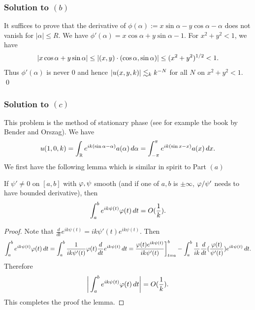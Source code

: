 \subsubsection*{Solution to $(b)$}
It suffices to prove that the derivative of $\phi(\alpha) := x\sin\alpha - y\cos\alpha - \alpha$ does not vanish for $|\alpha| \leq R$.
We have
$\phi'(\alpha) = x\cos\alpha + y\sin\alpha - 1$. For $x^{2} + y^{2} < 1$, we have
$$|x \cos\alpha + y\sin\alpha| \leq |(x, y) \cdot (\cos\alpha, \sin\alpha)| \leq (x^{2} + y^{2})^{1/2} < 1.$$
Thus $\phi'(\alpha)$ is never $0$ and hence $|u(x, y, k)| \lesssim_{k} k^{-N}$ for all $N$ on $x^{2} + y^{2} < 1$.
\hfill\qed

\subsubsection*{Solution to $(c)$}
This problem is the method of stationary phase (see for example the book by Bender and Orszag).
We have
$$u(1, 0, k) = \int_{\mathbb{R}}e^{ik(\sin\alpha - \alpha)}a(\alpha)\, d\alpha = \int_{-\pi}^{\pi}e^{ik(\sin x - x)}a(x)\, dx.$$
We first have the following lemma which is similar in spirit to Part $(a)$
\begin{lemma}\label{s077lem1}
If $\psi' \neq 0$ on $[a, b]$ with $\varphi, \psi$ smooth (and if one of $a, b$ is $\pm\infty$, $\varphi/\psi'$ needs to have bounded derivative),
then
$$\int_{a}^{b}e^{ik\psi(t)}\varphi(t)\, dt = O(\frac{1}{k}).$$
\end{lemma}
\begin{proof}
Note that $\frac{d}{dt}e^{ik\psi(t)} = ik\psi'(t)e^{ik\psi(t)}$. Then
\begin{align*}
\int_{a}^{b}e^{ik\psi(t)}\varphi(t)\, dt = \int_{a}^{b}\frac{1}{ik\psi'(t)}\varphi(t)\frac{d}{dt}e^{ik\psi(t)}\, dt = \frac{\varphi(t)e^{ik\psi(t)}}{ik\psi'(t)}\bigg]_{t = a}^{b} - \int_{a}^{b}\frac{1}{ik}\frac{d}{dt}(\frac{\varphi(t)}{\psi'(t)})e^{ik\psi(t)}\, dt.
\end{align*}
Therefore
$$\bigg| \int_{a}^{b}e^{ik\psi(t)}\varphi(t)\, dt \bigg| = O(\frac{1}{k}).$$
This completes the proof the lemma.
\end{proof}

